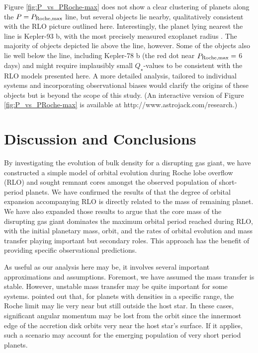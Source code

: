 \documentclass{svjour3}                     %
\begin{document}
Figure \ref{fig:P_vs_PRoche-max} does not show a clear clustering of planets along the $P = P_{\rm Roche, max}$ line, but several objects lie nearby, qualitatively consistent with the RLO picture outlined here. Interestingly, the planet lying nearest the line is Kepler-93 b, with the most precisely measured exoplanet radius \cite{2014ApJ...790...12B}. The majority of objects depicted lie above the line, however. Some of the objects also lie well below the line, including Kepler-78 b (the red dot near $P_{\rm Roche, max} =$ 6 days) and might require implausibly small $Q_\star$-values to be consistent with the RLO models presented here. A more detailed analysis, tailored to individual systems and incorporating observational biases would clarify the origins of these objects but is beyond the scope of this study. (An interactive version of Figure \ref{fig:P_vs_PRoche-max} is available at http://www.astrojack.com/research.)

\section{Discussion and Conclusions}
\label{sec:Discussion_and_Conclusions}
By investigating the evolution of bulk density for a disrupting gas giant, we have constructed a simple model of orbital evolution during Roche lobe overflow (RLO) and sought remnant cores amongst the observed population of short-period planets. We have confirmed the results of \cite{2015ApJ...813..101V} that the degree of orbital expansion accompanying RLO is directly related to the mass of remaining planet. We have also expanded those results to argue that the core mass of the disrupting gas giant dominates the maximum orbital period reached during RLO, with the initial planetary mass, orbit, and the rates of orbital evolution and mass transfer playing important but secondary roles. This approach has the benefit of providing specific observational predictions.

As useful as our analysis here may be, it involves several important approximations and assumptions. Foremost, we have assumed the mass transfer is stable. However, unstable mass transfer may be quite important for some systems. \cite{2012MNRAS.425.2778M} pointed out that, for planets with densities in a specific range, the Roche limit may lie very near but still outside the host star. In these cases, significant angular momentum may be lost from the orbit since the innermost edge of the accretion disk orbits very near the host star's surface. If it applies, such a scenario may account for the emerging population of very short period planets. 
\end{document}
